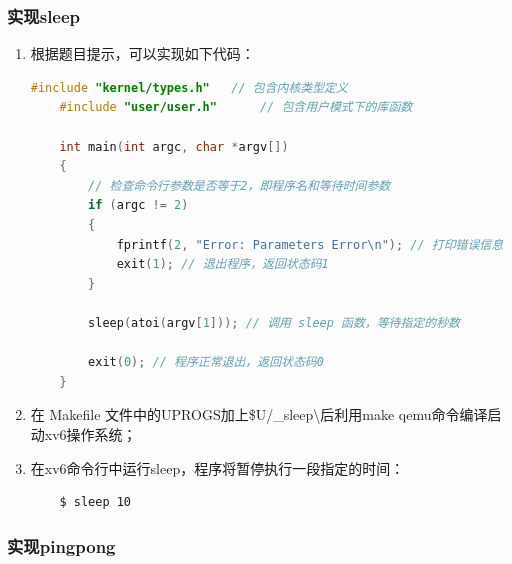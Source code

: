 \subsubsection{实现sleep}

\begin{enumerate}
    \item 根据题目提示，可以实现如下代码：
          \begin{lstlisting}[language=c, title=sleep.c]
    #include "kernel/types.h"   // 包含内核类型定义
    #include "user/user.h"      // 包含用户模式下的库函数

    int main(int argc, char *argv[])
    {
        // 检查命令行参数是否等于2，即程序名和等待时间参数
        if (argc != 2)
        {
            fprintf(2, "Error: Parameters Error\n"); // 打印错误信息
            exit(1); // 退出程序，返回状态码1
        }

        sleep(atoi(argv[1])); // 调用 sleep 函数，等待指定的秒数

        exit(0); // 程序正常退出，返回状态码0
    }
        \end{lstlisting}
    \item 在 Makefile 文件中的UPROGS加上\$U/\_sleep\textbackslash 后利用make qemu命令编译启动xv6操作系统；
    \item 在xv6命令行中运行sleep，程序将暂停执行一段指定的时间：
          \begin{lstlisting}
    $ sleep 10
        \end{lstlisting}
\end{enumerate}

\subsubsection{实现pingpong}

